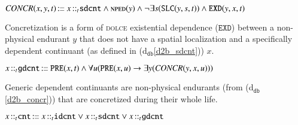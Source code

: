 \documentclass[ao]{iosart2x}
\newcommand{\dbDefLabel}{\textrm{d$_\texttt{db}$}}
\newcounter{cntdbdf}
\newcommand{\dbdf}[1]{\refstepcounter{cntdbdf}\begin{small}{\bf \dbDefLabel\thecntdbdf\label{#1}}\end{small}}
\newcommand{\refdbdf}[1]{({\dbDefLabel}\ref{#1})}
\newcommand{\pr}[1]{\mathtt{#1}}
\newcommand{\prbfo}[1]{{\textit{{#1}}}}
\newcommand{\cn}[1]{\mathtt{#1}}
\newcommand\textequal{%
 \rule[.08ex]{5pt}{0.35pt}\llap{\rule[.78ex]{5pt}{0.35pt}}}
\newcommand{\sdef}{{\hspace{1.5pt}:\hspace{-2.5pt}\textequal\hspace{3pt}}}
\newcommand{\dolce}{{\textsc{dolce}}}
\newcommand {\NPEDdcat} {\textsc{nped}}
\newcommand {\Sdcat} {\textsc{s}}
\newcommand {\PREd} {\ensuremath{\pr{PRE}}}
\newcommand {\DQTd} {\ensuremath{\pr{DQT}}}
\newcommand {\EXDd} {\ensuremath{\pr{EXD}}}
\newcommand {\SLCd} {\ensuremath{\pr{SLC}}}
\newcommand{\cntbcat}{\cn{cnt}}
\newcommand{\idcntbcat}{\cn{idcnt}}
\newcommand{\gdcntbcat}{\cn{gdcnt}}
\newcommand{\sdcntbcat}{\cn{sdcnt}}
\newcommand{\sregbcat}{\cn{sreg}}
\newcommand{\bfoiof}[1]{{\,::_{#1\:\!}}}
\newcommand{\bfoconcr}{\prbfo{CONCR}}
\begin{document}
\item[\dbdf{d2b_concr}] $\bfoconcr(x,y,t) \sdef x \bfoiof{t} \sdcntbcat \land \NPEDdcat(y) \land \neg\exists s(\SLCd(y,s,t))  \land \EXDd(y,x,t)$

\vspace{1pt}
Concretization is a form of {\dolce} existential dependence ($\EXDd$) between a non-physical endurant $y$ that does not have a spatial localization and a specifically dependent continuant (as defined in \refdbdf{d2b_sdcnt}) $x$.

%

\item[\dbdf{d2b_gdcnt}] $x \bfoiof{t} \gdcntbcat \sdef \PREd(x,t) \land \forall u(\PREd(x,u) \to \exists y(\bfoconcr(y,x,u)))$

\vspace{1pt}
Generic dependent continuants are non-physical endurants (from \refdbdf{d2b_concr}) that are concretized during their whole life.

%
%
%
%
%

\item[\dbdf{d2b_cnt}] $x \bfoiof{t} \cntbcat \sdef x \bfoiof{t} \idcntbcat \lor x \bfoiof{t} \sdcntbcat \lor x \bfoiof{t} \gdcntbcat$

%
\end{document}
